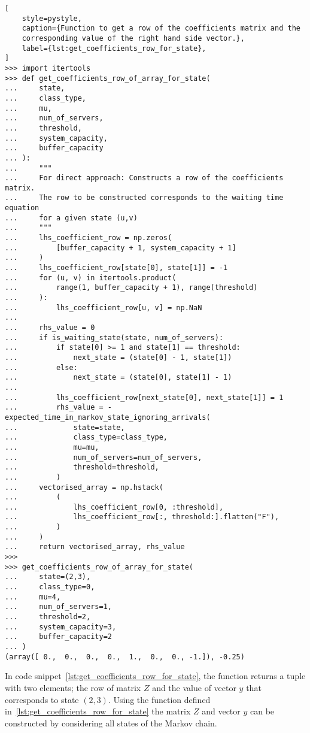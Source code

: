 \begin{lstlisting}[
    style=pystyle,
    caption={Function to get a row of the coefficients matrix and the
    corresponding value of the right hand side vector.},
    label={lst:get_coefficients_row_for_state},
]
>>> import itertools
>>> def get_coefficients_row_of_array_for_state(
...     state,
...     class_type,
...     mu,
...     num_of_servers,
...     threshold,
...     system_capacity,
...     buffer_capacity
... ):
...     """
...     For direct approach: Constructs a row of the coefficients matrix.
...     The row to be constructed corresponds to the waiting time equation
...     for a given state (u,v)
...     """
...     lhs_coefficient_row = np.zeros(
...         [buffer_capacity + 1, system_capacity + 1]
...     )
...     lhs_coefficient_row[state[0], state[1]] = -1
...     for (u, v) in itertools.product(
...         range(1, buffer_capacity + 1), range(threshold)
...     ):
...         lhs_coefficient_row[u, v] = np.NaN
... 
...     rhs_value = 0
...     if is_waiting_state(state, num_of_servers):
...         if state[0] >= 1 and state[1] == threshold:
...             next_state = (state[0] - 1, state[1])
...         else:
...             next_state = (state[0], state[1] - 1)
... 
...         lhs_coefficient_row[next_state[0], next_state[1]] = 1
...         rhs_value = -expected_time_in_markov_state_ignoring_arrivals(
...             state=state,
...             class_type=class_type,
...             mu=mu,
...             num_of_servers=num_of_servers,
...             threshold=threshold,
...         )
...     vectorised_array = np.hstack(
...         (
...             lhs_coefficient_row[0, :threshold],
...             lhs_coefficient_row[:, threshold:].flatten("F"),
...         )
...     )
...     return vectorised_array, rhs_value
>>>
>>> get_coefficients_row_of_array_for_state(
...     state=(2,3),
...     class_type=0,
...     mu=4,
...     num_of_servers=1,
...     threshold=2,
...     system_capacity=3,
...     buffer_capacity=2
... )
(array([ 0.,  0.,  0.,  0.,  1.,  0.,  0., -1.]), -0.25)

\end{lstlisting}

In code snippet~\ref{lst:get_coefficients_row_for_state}, the function returns
a tuple with two elements; the row of
matrix \(Z\) and the value of vector \(y\) that corresponds to state \((2,3)\).
Using the function defined in~\ref{lst:get_coefficients_row_for_state}
the matrix \(Z\) and vector \(y\) can be constructed
by considering all states of the Markov chain.

